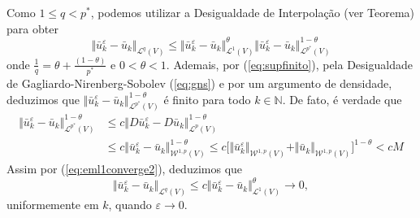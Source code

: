 \documentclass[a4paper, 11pt]{book}
\theoremstyle{definition}
\newcommand{\bN}{\mathbb{N}}
\newcommand{\cL}{\mathcal{L}}
\newcommand{\cW}{\mathcal{W}}
\begin{document}
\begin{prf}
    Como $1 \leqslant q < p^*$, podemos utilizar a Desigualdade de Interpolação (ver Teorema) para obter
    \[
        \Vert \bar u_k^\varepsilon - \bar u_k \Vert_{\cL^q(V)} \leqslant \Vert \bar u_k^\varepsilon - \bar u_k \Vert_{\cL^1(V)}^\theta \Vert \bar u_k^\varepsilon - \bar u_k \Vert_{\cL^{p^*}(V)}^{1- \theta}
    \]
    onde $\frac{1}{q} = \theta + \frac{(1 - \theta)}{p^*}$ e $0 < \theta < 1$.
    Ademais, por (\ref{eq:supfinito}), pela Desigualdade de Gagliardo-Nirenberg-Sobolev (\ref{eq:gns}) e por um argumento de densidade, deduzimos que $\Vert \bar u_k^\varepsilon - \bar u_k \Vert_{\cL^{p^*}(V)}^{1- \theta}$ é finito para todo $k \in\bN$. De fato, é verdade que
    \begin{equation} \label{eq:idk}
        \begin{aligned}
            \Vert \bar u_k^\varepsilon - \bar u_k \Vert_{\cL^{p^*}(V)}^{1 - \theta} &\leqslant c \Vert D\bar u_k^\varepsilon - D\bar u_k \Vert_{\cL^p(V)}^{1 - \theta}\\ 
            &\leqslant c \Vert \bar u_k^\varepsilon - \bar u_k \Vert_{\cW^{1,p}(V)}^{1- \theta} \leqslant c \big[\Vert \bar u_k^\varepsilon \Vert_{\cW^{1,p}(V)} + \Vert \bar u_k \Vert_{\cW^{1,p}(V)} \big]^{1-\theta} < cM 
        \end{aligned}
    \end{equation}
    Assim por (\ref{eq:eml1converge2}), deduzimos que
    \[
        \Vert \bar u_k^\varepsilon - \bar u_k \Vert_{\cL^q(V)} \leqslant c \Vert \bar u_k^\varepsilon - \bar u_k \Vert_{\cL^1(V)}^\theta \to 0,
    \]
    uniformemente em $k$, quando $\varepsilon \to 0$.


\end{prf}
\end{document}
